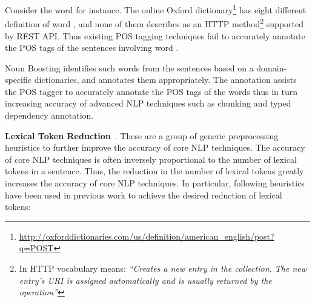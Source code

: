 Consider the word  for instance. 
The online Oxford dictionary\footnote{\url{http://oxforddictionaries.com/us/definition/american_english/post?q=POST}} has eight different definition of word , and none of them describes  as an HTTP method\footnote{In HTTP vocabulary  means: \textit{``Creates a new entry in the collection.
The new entry's URI is assigned automatically and is usually returned by the operation''}}
supported by REST API.
Thus existing POS tagging techniques fail to accurately annotate the POS tags of the sentences involving word .  

Noun Boosting identifies such words from the sentences based on a domain-specific dictionaries, and annotates them appropriately.
The annotation assists the POS tagger to accurately annotate the POS tags of the words thus in turn increasing accuracy of advanced NLP techniques such as chunking and typed dependency annotation.

\textbf{Lexical Token Reduction}~\cite{pandita13:WHYPER}.
These are a group of generic preprocessing heuristics to further improve the accuracy of core NLP techniques.
The accuracy of core NLP techniques is often inversely proportional to the number of lexical tokens in a sentence.
Thus, the reduction in the number of lexical tokens greatly increases the accuracy of core NLP techniques. 
In particular, following heuristics have been used in previous work to achieve the desired reduction of lexical tokens:

